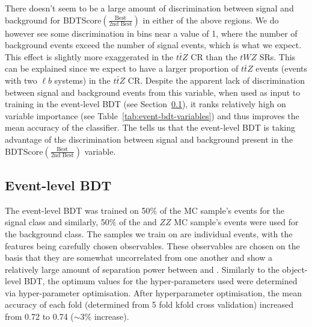 There doesn't seem to be a large amount of discrimination between signal and background for BDTScore$(\frac{\text{Best}}{\text{2nd Best}})$ in either of the above regions. We do however see some discrimination in bins near a value of 1, where the number of background events exceed the number of signal events, which is what we expect. This effect is slightly more exaggerated in the $t\bar{t}Z$ CR than the $tWZ$ SRs. This can be explained since we expect to have a larger proportion of $t\bar{t}Z$ events (events with two $\ell b$ systems) in the $t\bar{t}Z$ CR. Despite the apparent lack of discrimination between signal and background events from this variable, when used as input to training in the event-level BDT (see Section~\ref{sec:event-level-bdt}), it ranks relatively high on variable importance (see Table~\ref{tab:event-bdt-variables}) and thus improves the mean accuracy of the classifier. The tells us that the event-level BDT is taking advantage of the discrimination between signal and background present in the BDTScore$(\frac{\text{Best}}{\text{2nd Best}})$ variable.

\subsection{Event-level BDT}
\label{sec:event-level-bdt}
The event-level BDT was trained on 50$\%$ of the \tWZ MC sample's events for the signal class and similarly, 50$\%$ of the \ttZ and $ZZ$ MC sample's events were used for the background class. The samples we train on are individual events, with the features being carefully chosen observables. These observables are chosen on the basis that they are somewhat uncorrelated from one another and show a relatively large amount of separation power between \tWZ and \ttZ. Similarly to the object-level BDT, the optimum values for the hyper-parameters used were determined via hyper-parameter optimisation.  After hyperparameter optimisation, the mean accuracy of each fold (determined from 5 fold kfold cross validation) increased from 0.72 to 0.74 ($\sim 3\%$ increase). 

